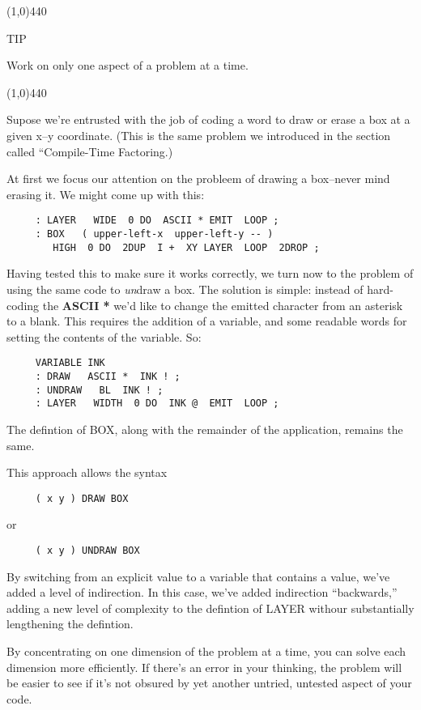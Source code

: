 \documentclass{book}
\begin{document}
\line(1,0){440} 

TIP 

Work on only one aspect of a problem at a time.

\line(1,0){440}

\noindent
Supose we're entrusted with the job of coding a word to draw or erase a box at a given x--y coordinate. (This is the same problem we introduced in the section called ``Compile-Time Factoring.)

At first we focus our attention on the probleem of drawing a box--never mind erasing it. We might come up with this:

\begin{verbatim}
     : LAYER   WIDE  0 DO  ASCII * EMIT  LOOP ;
     : BOX   ( upper-left-x  upper-left-y -- )
        HIGH  0 DO  2DUP  I +  XY LAYER  LOOP  2DROP ;
\end{verbatim}

\noindent
Having tested this to make sure it works correctly, we turn now to the problem of using the same code to \textit{un}draw a box. The solution is simple: instead of hard-coding the \textbf{ASCII *} we'd like to change the emitted character from an asterisk to a blank. This requires the addition of a variable, and some readable words for setting the contents of the variable. So:

\begin{verbatim}
     VARIABLE INK
     : DRAW   ASCII *  INK ! ;
     : UNDRAW   BL  INK ! ;
     : LAYER   WIDTH  0 DO  INK @  EMIT  LOOP ;
\end{verbatim}

\noindent
The defintion of BOX, along with the remainder of the application, remains the same.

This approach allows the syntax

\begin{verbatim}
     ( x y ) DRAW BOX
\end{verbatim}

\noindent
or

\begin{verbatim}
     ( x y ) UNDRAW BOX
\end{verbatim}

\noindent
By switching from an explicit value to a variable that contains a value, we've added a level of indirection. In this case, we've added indirection ``backwards,'' adding a new level of complexity to the defintion of LAYER withour substantially lengthening the defintion.

By concentrating on one dimension of the problem at a time, you can solve each dimension more efficiently. If there's an error in your thinking, the problem will be easier to see if it's not obsured by yet another untried, untested aspect of your code.
\end{document}

